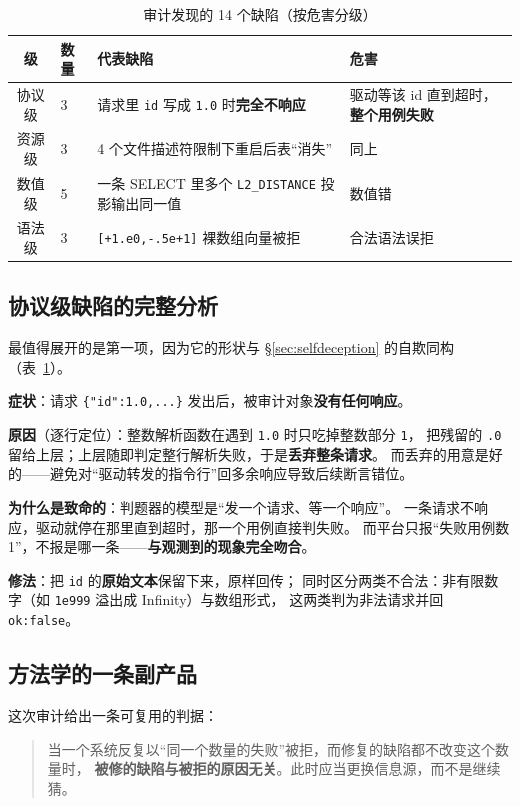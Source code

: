 \documentclass[11pt,a4paper]{article}
\newcommand{\code}[1]{\texttt{#1}}
\begin{document}
\begin{table}[tbp]\centering\small
\caption{审计发现的 14 个缺陷（按危害分级）}\label{tab:defects}
\setlength{\tabcolsep}{4pt}
\begin{tabular}{clp{6.8cm}l}
\toprule
级 & 数量 & 代表缺陷 & 危害\\
\midrule
协议级 & 3 & 请求里 \code{id} 写成 \code{1.0} 时\textbf{完全不响应} & 驱动等该 id 直到超时，\textbf{整个用例失败}\\
资源级 & 3 & 4 个文件描述符限制下重启后表“消失” & 同上\\
数值级 & 5 & 一条 SELECT 里多个 \code{L2\_DISTANCE} 投影输出同一值 & 数值错\\
语法级 & 3 & \code{[+1.e0,-.5e+1]} 裸数组向量被拒 & 合法语法误拒\\
\bottomrule
\end{tabular}
\end{table}

\subsection{协议级缺陷的完整分析}
最值得展开的是第一项，因为它的形状与 §\ref{sec:selfdeception} 的自欺同构（表~\ref{tab:defects}）。

\textbf{症状}：请求 \code{\{"id":1.0,...\}} 发出后，被审计对象\textbf{没有任何响应}。

\textbf{原因}（逐行定位）：整数解析函数在遇到 \code{1.0} 时只吃掉整数部分 \code{1}，
把残留的 \code{.0} 留给上层；上层随即判定整行解析失败，于是\textbf{丢弃整条请求}。
而丢弃的用意是好的——避免对“驱动转发的指令行”回多余响应导致后续断言错位。

\textbf{为什么是致命的}：判题器的模型是“发一个请求、等一个响应”。
一条请求不响应，驱动就停在那里直到超时，那一个用例直接判失败。
而平台只报“失败用例数 1”，不报是哪一条——\textbf{与观测到的现象完全吻合}。

\textbf{修法}：把 \code{id} 的\textbf{原始文本}保留下来，原样回传；
同时区分两类不合法：非有限数字（如 \code{1e999} 溢出成 Infinity）与数组形式，
这两类判为非法请求并回 \code{ok:false}。

\subsection{方法学的一条副产品}
这次审计给出一条可复用的判据：

\begin{quote}\small
当一个系统反复以“同一个数量的失败”被拒，而修复的缺陷都不改变这个数量时，
\textbf{被修的缺陷与被拒的原因无关}。此时应当更换信息源，而不是继续猜。
\end{quote}
\end{document}
